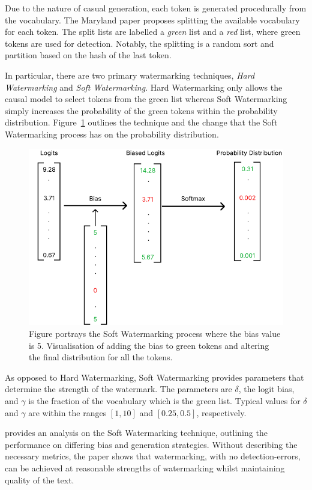 \documentclass{l4proj}
\theoremstyle{definition}
\begin{document}
        Due to the nature of casual generation, each token is generated procedurally from the vocabulary. The Maryland paper proposes splitting the available vocabulary for each token. The split lists are labelled a \emph{green} list and a \emph{red} list, where green tokens are used for detection. Notably, the splitting is a random sort and partition based on the hash of the last token.

        In particular, there are two primary watermarking techniques, \emph{Hard Watermarking} and \emph{Soft Watermarking}. Hard Watermarking only allows the causal model to select tokens from the green list whereas Soft Watermarking simply increases the probability of the green tokens within the probability distribution. Figure~\ref{fig:soft-watermarking-process} outlines the technique and the change that the Soft Watermarking process has on the probability distribution.

        \begin{figure}
            \centering
            \includegraphics[width=0.5\linewidth, keepaspectratio]{images/background/biasing-process.pdf}
            \caption{Figure portrays the Soft Watermarking process where the bias value is 5. Visualisation of adding the bias to green tokens and altering the final distribution for all the tokens.}
            \label{fig:soft-watermarking-process}
        \end{figure}

        As opposed to Hard Watermarking, Soft Watermarking provides parameters that determine the strength of the watermark. The parameters are $\delta$, the logit bias, and $\gamma$ is the fraction of the vocabulary which is the green list. Typical values for $\delta$ and $\gamma$ are within the ranges $[1, 10]$ and $[0.25, 0.5]$, respectively.

        \citet{kirchenbauer2023watermark} provides an analysis on the Soft Watermarking technique, outlining the performance on differing bias and generation strategies. Without describing the necessary metrics, the paper shows that watermarking, with no detection-errors, can be achieved at reasonable strengths of watermarking whilst maintaining quality of the text.
        
\end{document}
